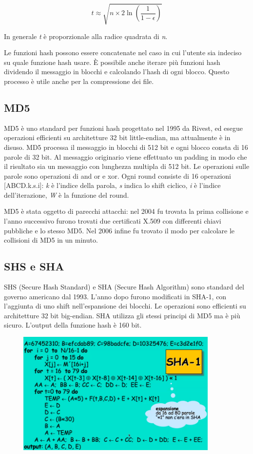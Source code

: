 \[t \approx \sqrt{n \times 2 \ln (\frac{1}{1 - \epsilon})}\]

In generale \textit{t} è proporzionale alla radice quadrata di \textit{n}. 

Le funzioni hash possono essere concatenate nel caso in cui l'utente sia indeciso su quale funzione hash usare. È possibile anche iterare più funzioni hash dividendo il messaggio in blocchi e calcolando l'hash di ogni blocco. Questo processo è utile anche per la compressione dei file.

\subsection{MD5}
MD5 è uno standard per funzioni hash progettato nel 1995 da Rivest, ed esegue operazioni efficienti su architetture 32 bit little-endian, ma attualmente è in disuso. MD5 processa il messaggio in blocchi di 512 bit e ogni blocco consta di 16 parole di 32 bit. Al messaggio originario viene effettuato un padding in modo che il risultato sia un messaggio con lunghezza multipla di 512 bit. Le operazioni sulle parole sono operazioni di and or e xor. Ogni round consiste di 16 operazioni [ABCD.k.s.i]: \textit{k} è l'indice della parola, \textit{s} indica lo shift ciclico, \textit{i} è l'indice dell'iterazione, \textit{W} è la funzione del round.

MD5 è stata oggetto di parecchi attacchi: nel 2004 fu trovata la prima collisione e l'anno successivo furono trovati due certificati X.509 con differenti chiavi pubbliche e lo stesso MD5. Nel 2006 infine fu trovato il modo per calcolare le collisioni di MD5 in un minuto. 

\subsection{SHS e SHA}
SHS (Secure Hash Standard) e SHA (Secure Hash Algorithm) sono standard del governo americano dal 1993. L'anno dopo furono modificati in SHA-1, con l'aggiunta di uno shift nell'espansione dei blocchi. Le operazioni sono efficienti su architetture 32 bit big-endian. SHA utilizza gli stessi principi di MD5 ma è più sicuro. L'output della funzione hash è 160 bit. 

\begin{figure}[htb!]
    \centering
    \includegraphics[width=10cm]{./Images/cap1/1.54.png}
\end{figure} 

